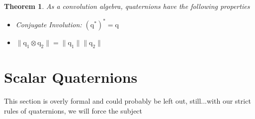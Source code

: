 \documentclass{amsart}
\newtheorem{theorem}{Theorem}[section]
\theoremstyle{definition}
\theoremstyle{remark}
\numberwithin{equation}{section}
\begin{document}
\begin{theorem}
	As a convolution algebra, quaternions have the following properties
	\begin{itemize}
	\item Conjugate Involution: $(\mathrm{q}^*)^*=\mathrm{q}$
	\item $\|\mathrm{q}_1\otimes \mathrm{q}_2\| = \|\mathrm{q}_1\|\|\mathrm{q}_2\|$
	\end{itemize}
\end{theorem}


\section{Scalar Quaternions}
This section is overly formal and could probably be left out, still...with our strict rules of quaternions, we will force the subject
\end{document}
